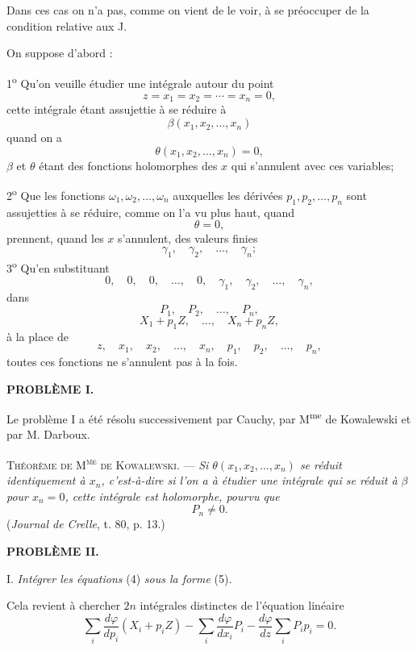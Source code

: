 \documentclass[11pt]{article}
\begin{document}
Dans ces cas on n’a pas, comme on vient de le voir, à se préoccuper de la condition relative aux J.

On suppose d’abord :

1\textsuperscript{o} Qu’on veuille étudier une intégrale autour du point
\[
z=x_1=x_2=\cdots=x_n=0,
\]
cette intégrale étant assujettie à se réduire à
\[
\beta(x_1,x_2,\ldots,x_n)
\]
quand on a
\[
\theta(x_1,x_2,\ldots,x_n)=0,
\]
$\beta$ et $\theta$ étant des fonctions holomorphes des $x$ qui s’annulent avec ces variables;

2\textsuperscript{o} Que les fonctions $\omega_1,\omega_2,\ldots,\omega_n$ auxquelles les dérivées $p_1,p_2,\ldots,p_n$ sont assujetties à se réduire, comme on l’a vu plus haut, quand
\[
\theta=0,
\]
prennent, quand les $x$ s’annulent, des valeurs finies
\[
\gamma_1,\quad \gamma_2,\quad \ldots,\quad \gamma_n;
\]
3\textsuperscript{o} Qu’en substituant
\[
0,\quad 0,\quad 0,\quad \ldots,\quad 0,\quad \gamma_1,\quad \gamma_2,\quad \ldots,\quad \gamma_n,
\]
dans
\[
P_1,\quad P_2,\quad \ldots,\quad P_n,
\]
\[
X_1+p_1Z,\quad \ldots,\quad X_n+p_nZ,
\]
à la place de
\[
z,\quad x_1,\quad x_2,\quad \ldots,\quad x_n,\quad p_1,\quad p_2,\quad \ldots,\quad p_n,
\]
toutes ces fonctions ne s’annulent pas à la fois.

\begin{center}
\textbf{PROBLÈME I.}
\end{center}

Le problème I a été résolu successivement par Cauchy, par M\textsuperscript{me} de Kowalewski et par M. Darboux.

\medskip
\noindent\textsc{Théorème de M\textsuperscript{me} de Kowalewski.} — \emph{Si $\theta(x_1,x_2,\ldots,x_n)$ se réduit identiquement à $x_n$, c’est-à-dire si l’on a à étudier une intégrale qui se réduit à $\beta$ pour $x_n=0$, cette intégrale est holomorphe, pourvu que}
\[
P_n\ne0.
\]
(\emph{Journal de Crelle}, t. 80, p. 13.)

\begin{center}
\textbf{PROBLÈME II.}
\end{center}

I. \emph{Intégrer les équations} (4) \emph{sous la forme} (5).

Cela revient à chercher $2n$ intégrales distinctes de l’équation linéaire
\begin{equation*}\tag{7}
\sum_i \frac{d\varphi}{dp_i}(X_i+p_iZ)-\sum_i \frac{d\varphi}{dx_i}P_i-
\frac{d\varphi}{dz}\sum_i P_ip_i=0.
\end{equation*}
\end{document}
